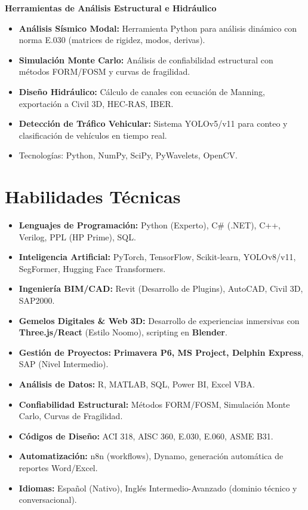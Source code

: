 \documentclass[10pt, a4paper]{article}
\begin{document}
\vspace{2mm}

\textbf{Herramientas de Análisis Estructural e Hidráulico}
\begin{itemize}
    \item \textbf{Análisis Sísmico Modal:} Herramienta Python para análisis dinámico con norma E.030 (matrices de rigidez, modos, derivas).
    \item \textbf{Simulación Monte Carlo:} Análisis de confiabilidad estructural con métodos FORM/FOSM y curvas de fragilidad.
    \item \textbf{Diseño Hidráulico:} Cálculo de canales con ecuación de Manning, exportación a Civil 3D, HEC-RAS, IBER.
    \item \textbf{Detección de Tráfico Vehicular:} Sistema YOLOv5/v11 para conteo y clasificación de vehículos en tiempo real.
    \item Tecnologías: Python, NumPy, SciPy, PyWavelets, OpenCV.
\end{itemize}

\vspace{3mm}

\section*{Habilidades Técnicas}
\begin{itemize}
    \item \textbf{Lenguajes de Programación:} Python (Experto), C\# (.NET), C++, Verilog, PPL (HP Prime), SQL.
    \item \textbf{Inteligencia Artificial:} PyTorch, TensorFlow, Scikit-learn, YOLOv8/v11, SegFormer, Hugging Face Transformers.
    \item \textbf{Ingeniería BIM/CAD:} Revit (Desarrollo de Plugins), AutoCAD, Civil 3D, SAP2000.
    \item \textbf{Gemelos Digitales & Web 3D:} Desarrollo de experiencias inmersivas con \textbf{Three.js/React} (Estilo Noomo), scripting en \textbf{Blender}.
    \item \textbf{Gestión de Proyectos:} \textbf{Primavera P6, MS Project, Delphin Express}, SAP (Nivel Intermedio).
    \item \textbf{Análisis de Datos:} R, MATLAB, SQL, Power BI, Excel VBA.
    \item \textbf{Confiabilidad Estructural:} Métodos FORM/FOSM, Simulación Monte Carlo, Curvas de Fragilidad.
    \item \textbf{Códigos de Diseño:} ACI 318, AISC 360, E.030, E.060, ASME B31.
    \item \textbf{Automatización:} n8n (workflows), Dynamo, generación automática de reportes Word/Excel.
    \item \textbf{Idiomas:} Español (Nativo), Inglés Intermedio-Avanzado (dominio técnico y conversacional).
\end{itemize}
\end{document}
